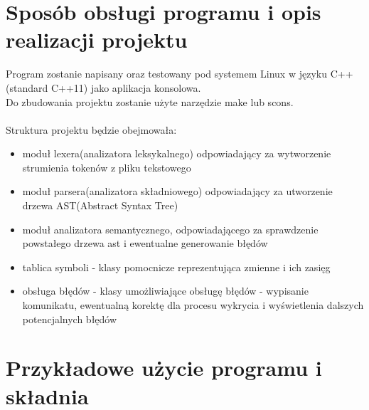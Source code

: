 \documentclass[12pt]{article}
\begin{document}
\section{Sposób obsługi programu i opis realizacji projektu}
Program zostanie napisany oraz testowany pod systemem Linux w języku C++(standard C++11) jako aplikacja konsolowa. \\
Do zbudowania projektu zostanie użyte narzędzie make lub scons. \\ \\
Struktura projektu będzie obejmowała:
\begin{itemize}
\item moduł lexera(analizatora leksykalnego) odpowiadający za wytworzenie strumienia tokenów z pliku tekstowego
\item moduł parsera(analizatora składniowego) odpowiadający za utworzenie drzewa AST(Abstract Syntax Tree)
\item moduł analizatora semantycznego, odpowiadającego za sprawdzenie powstałego drzewa ast i ewentualne generowanie błędów
\item tablica symboli - klasy pomocnicze reprezentująca zmienne i ich zasięg
\item obsługa błędów - klasy umożliwiające obsługę błędów - wypisanie komunikatu, ewentualną korektę dla procesu wykrycia i wyświetlenia dalszych potencjalnych błędów
\end{itemize}

\section{Przykładowe użycie programu i składnia}
\end{document}
